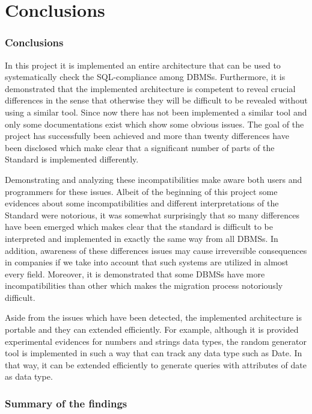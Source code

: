 \chapter{Conclusions}

\subsection{Conclusions}

In this project it is implemented an entire architecture that can be used to systematically check the SQL-compliance among DBMSs. Furthermore, it is demonstrated that the implemented architecture is competent to reveal crucial differences in the sense that otherwise they will be difficult to be revealed without using a similar tool. Since now there has not been implemented a similar tool and only some documentations exist which show some obvious issues. The goal of the project has successfully been achieved and more than twenty differences have been disclosed which make clear that a significant number of parts of the Standard is implemented differently.

Demonstrating and analyzing these incompatibilities make aware both users and programmers for these issues. Albeit of the beginning of this project some evidences about some incompatibilities and different interpretations of the Standard were notorious, it was somewhat surprisingly that so many differences have been emerged which makes clear that the standard is difficult to be interpreted and implemented in exactly the same way from all DBMSs. In addition, awareness of these differences issues may cause irreversible consequences in companies if we take into account that such systems are utilized in almost every field. Moreover, it is demonstrated that some DBMSs have more incompatibilities than other which makes  the migration process notoriously difficult. 

Aside from the issues which have been detected, the implemented architecture is portable and they can extended efficiently. For example, although it is provided experimental evidences for numbers and strings data types, the random generator tool is implemented in such a way that can track any data type such as Date. In that way, it can be extended efficiently to generate queries with attributes of date as data type. 

\subsection{Summary of the findings}


